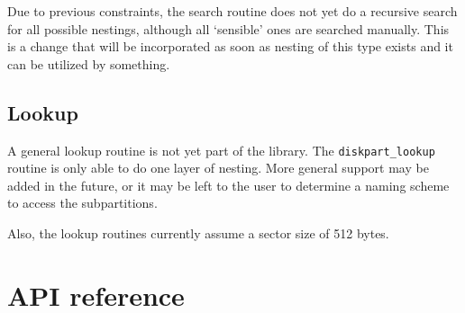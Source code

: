 Due to previous constraints, the search routine does not yet do a recursive
search for all possible nestings, although all `sensible' ones are searched
manually.  This is a change that will be incorporated as soon as nesting of 
this type exists and it can be utilized by something.

\subsection{Lookup}
A general lookup routine is not yet part of the library.
The {\tt diskpart_lookup} routine is only able to do one layer of nesting.
More general support may be added in the future, 
or it may be left to the user to 
determine a naming scheme to access the subpartitions.

Also, the lookup routines currently assume a sector size of 512 bytes.

\section{API reference}

